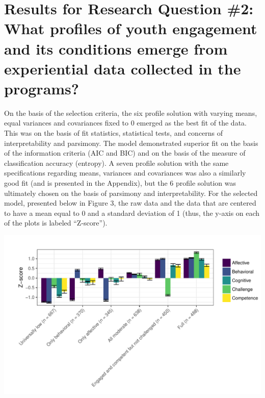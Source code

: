 \documentclass[]{msu-thesis}
\theoremstyle{definition}
\theoremstyle{definition}
\theoremstyle{definition}
\theoremstyle{remark}
\begin{document}
\section{Results for Research Question \#2: What profiles of youth
engagement and its conditions emerge from experiential data collected in
the
programs?}\label{results-for-research-question-2-what-profiles-of-youth-engagement-and-its-conditions-emerge-from-experiential-data-collected-in-the-programs}

On the basis of the selection criteria, the six profile solution with
varying means, equal variances and covariances fixed to 0 emerged as the
best fit of the data. This was on the basis of fit statistics,
statistical tests, and concerns of interpretability and parsimony. The
model demonstrated superior fit on the basis of the information criteria
(AIC and BIC) and on the basis of the measure of classification accuracy
(entropy). A seven profile solution with the same specifications
regarding means, variances and covariances was also a similarly good fit
(and is presented in the Appendix), but the 6 profile solution was
ultimately chosen on the basis of parsimony and interpretability. For
the selected model, presented below in Figure 3, the raw data and the
data that are centered to have a mean equal to 0 and a standard
deviation of 1 (thus, the y-axis on each of the plots is labeled
``Z-score'').

\begin{center}\includegraphics[width=1\linewidth]{rosenberg-dissertation_files/figure-latex/unnamed-chunk-10-1} \end{center}
\end{document}
